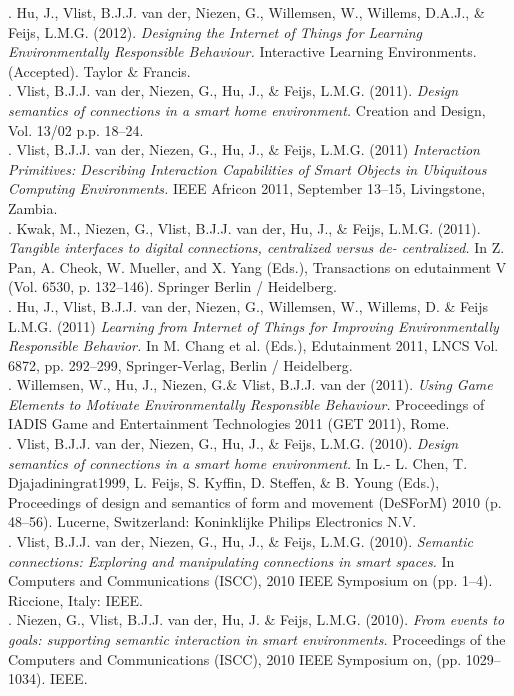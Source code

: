 . Hu, J., Vlist, B.J.J. van der, Niezen, G., Willemsen, W., Willems, D.A.J., \& Feijs, L.M.G. (2012). \emph{Designing the Internet of Things for Learning Environmentally Responsible Behaviour.} Interactive Learning Environments. (Accepted). Taylor \& Francis.\\

. Vlist, B.J.J. van der, Niezen, G., Hu, J., \& Feijs, L.M.G. (2011). \emph{Design semantics of connections in a smart home environment.} Creation and Design, Vol. 13/02 p.p. 18--24.\\

. Vlist, B.J.J. van der, Niezen, G., Hu, J., \& Feijs, L.M.G. (2011) \emph{Interaction Primitives: Describing Interaction Capabilities of Smart Objects in Ubiquitous Computing Environments.} IEEE Africon 2011, September 13--15, Livingstone, Zambia.\\

. Kwak, M., Niezen, G., Vlist, B.J.J. van der, Hu, J., \& Feijs, L.M.G. (2011). \emph{Tangible interfaces to digital connections, centralized versus de- centralized.} In Z. Pan, A. Cheok, W. Mueller, and X. Yang (Eds.), Transactions on edutainment V (Vol. 6530, p. 132--146). Springer Berlin / Heidelberg.\\

. Hu, J., Vlist, B.J.J. van der, Niezen, G., Willemsen, W., Willems, D. \& Feijs L.M.G. (2011) \emph{Learning from Internet of Things for Improving Environmentally Responsible Behavior.} In M. Chang et al. (Eds.), Edutainment 2011, LNCS Vol. 6872, pp. 292--299, Springer-Verlag, Berlin / Heidelberg.\\

. Willemsen, W., Hu, J., Niezen, G.\& Vlist, B.J.J. van der (2011). \emph{Using Game Elements to Motivate Environmentally Responsible Behaviour.} Proceedings of IADIS Game and Entertainment Technologies 2011 (GET 2011), Rome.\\

. Vlist, B.J.J. van der, Niezen, G., Hu, J., \& Feijs, L.M.G. (2010). \emph{Design semantics of connections in a smart home environment.} In L.- L. Chen, T. Djajadiningrat1999, L. Feijs, S. Kyffin, D. Steffen, \&  B. Young (Eds.), Proceedings of design and semantics of form and movement (DeSForM) 	2010 (p. 48--56). Lucerne, Switzerland: Koninklijke Philips Electronics N.V.\\

. Vlist, B.J.J. van der, Niezen, G., Hu, J., \& Feijs, L.M.G. (2010). \emph{Semantic connections: Exploring and manipulating connections in smart spaces.} In Computers and Communications (ISCC), 2010 IEEE Symposium on (pp. 1--4). Riccione, Italy: IEEE.\\

. Niezen, G., Vlist, B.J.J. van der, Hu, J. \& Feijs, L.M.G. (2010). \emph{From events to goals: supporting semantic interaction in smart environments.} Proceedings of the Computers and Communications (ISCC), 2010 IEEE Symposium on, (pp. 1029--1034). IEEE.\\


